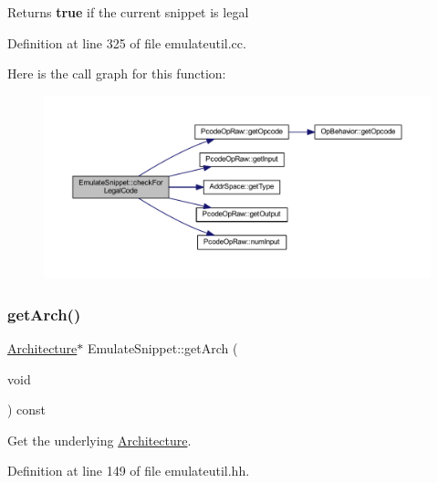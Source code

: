 \begin{DoxyReturn}{Returns}
{\bfseries{true}} if the current snippet is legal 
\end{DoxyReturn}


Definition at line 325 of file emulateutil.\+cc.

Here is the call graph for this function\+:
\nopagebreak
\begin{figure}[H]
\begin{center}
\leavevmode
\includegraphics[width=350pt]{class_emulate_snippet_ad83f137b630e90877b05ea13f8d1d1be_cgraph}
\end{center}
\end{figure}
\mbox{\label{class_emulate_snippet_a17efc692edeba1967afa4ff66f42fc5f}} 
\subsubsection{\texorpdfstring{getArch()}{getArch()}}
{\footnotesize\ttfamily \mbox{\hyperlink{class_architecture}{Architecture}}$\ast$ Emulate\+Snippet\+::get\+Arch (\begin{DoxyParamCaption}\item[{void}]{ }\end{DoxyParamCaption}) const\hspace{0.3cm}{\ttfamily [inline]}}



Get the underlying \mbox{\hyperlink{class_architecture}{Architecture}}. 



Definition at line 149 of file emulateutil.\+hh.

\mbox{\label{class_emulate_snippet_aef11e510794c009453333e847acc38e9}} 
